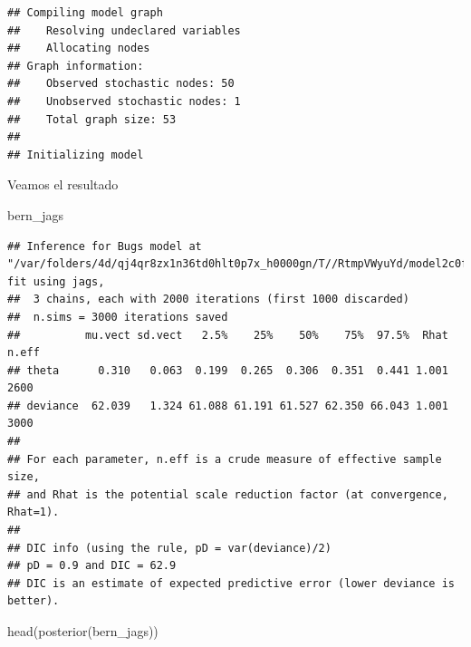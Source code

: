 \documentclass[
  12pt,
]{book}
\newenvironment{Shaded}{\begin{snugshade}}{\end{snugshade}}
\newcommand{\AttributeTok}[1]{\textcolor[rgb]{0.77,0.63,0.00}{#1}}
\newcommand{\FunctionTok}[1]{\textcolor[rgb]{0.00,0.00,0.00}{#1}}
\newcommand{\NormalTok}[1]{#1}
\newcommand{\OtherTok}[1]{\textcolor[rgb]{0.56,0.35,0.01}{#1}}
\newcommand{\SpecialCharTok}[1]{\textcolor[rgb]{0.00,0.00,0.00}{#1}}
\newcommand{\StringTok}[1]{\textcolor[rgb]{0.31,0.60,0.02}{#1}}
\theoremstyle{definition}
\theoremstyle{definition}
\theoremstyle{definition}
\theoremstyle{definition}
\theoremstyle{remark}
\begin{document}
\begin{Shaded}
\end{Shaded}

\begin{verbatim}
## Compiling model graph
##    Resolving undeclared variables
##    Allocating nodes
## Graph information:
##    Observed stochastic nodes: 50
##    Unobserved stochastic nodes: 1
##    Total graph size: 53
## 
## Initializing model
\end{verbatim}

Veamos el resultado

\begin{Shaded}
\begin{Highlighting}[]
\NormalTok{bern\_jags}
\end{Highlighting}
\end{Shaded}

\begin{verbatim}
## Inference for Bugs model at "/var/folders/4d/qj4qr8zx1n36td0hlt0p7x_h0000gn/T//RtmpVWyuYd/model2c0f3d163764.txt", fit using jags,
##  3 chains, each with 2000 iterations (first 1000 discarded)
##  n.sims = 3000 iterations saved
##          mu.vect sd.vect   2.5%    25%    50%    75%  97.5%  Rhat n.eff
## theta      0.310   0.063  0.199  0.265  0.306  0.351  0.441 1.001  2600
## deviance  62.039   1.324 61.088 61.191 61.527 62.350 66.043 1.001  3000
## 
## For each parameter, n.eff is a crude measure of effective sample size,
## and Rhat is the potential scale reduction factor (at convergence, Rhat=1).
## 
## DIC info (using the rule, pD = var(deviance)/2)
## pD = 0.9 and DIC = 62.9
## DIC is an estimate of expected predictive error (lower deviance is better).
\end{verbatim}

\begin{Shaded}
\begin{Highlighting}[]
\FunctionTok{head}\NormalTok{(}\FunctionTok{posterior}\NormalTok{(bern\_jags))}
\end{Highlighting}
\end{Shaded}
\end{document}
